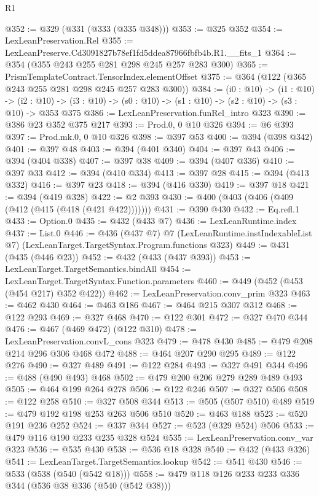 \begin{lexlean}{R1}
\begin{coremodule}
@352 := @329 (@331 (@333 (@335 @348)))
@353 := @325 @352
@354 := LexLeanPreservation.Rel
@355 := LexLeanPreserve.Cd3091827b78ef1fd5ddea87966fbfb4b.R1.__fits_1
@364 := @354 (@355 @243 @255 @281 @298 @245 @257 @283 @300)
@365 := PrismTemplateContract.TensorIndex.elementOffset
@375 := @364 (@122 (@365 @243 @255 @281 @298 @245 @257 @283 @300))
@384 := (i0 : @10) ->
  (i1 : @10) ->
  (i2 : @10) -> (i3 : @10) -> (s0 : @10) -> (s1 : @10) -> (s2 : @10) -> (s3 : @10) -> @353 @375
@386 := LexLeanPreservation.funRel_intro @323
@390 := @386 @23 @352 @375 @217
@393 := Prod.{0, 0} @10 @326
@394 := @6 @393
@397 := Prod.mk.{0, 0} @10 @326
@398 := @397 @53
@400 := @394 (@398 @342)
@401 := @397 @48
@403 := @394 (@401 @340)
@404 := @397 @43
@406 := @394 (@404 @338)
@407 := @397 @38
@409 := @394 (@407 @336)
@410 := @397 @33
@412 := @394 (@410 @334)
@413 := @397 @28
@415 := @394 (@413 @332)
@416 := @397 @23
@418 := @394 (@416 @330)
@419 := @397 @18
@421 := @394 (@419 @328)
@422 := @2 @393
@430 := @400 (@403 (@406 (@409 (@412 (@415 (@418 (@421 @422)))))))
@431 := @390 @430
@432 := Eq.refl.{1}
@433 := Option.{0}
@435 := @432 (@433 @7)
@436 := LexLeanRuntime.index
@437 := List.{0}
@446 := @436
    (@437 @7)
    @7
    (LexLeanRuntime.instIndexableList @7)
    (LexLeanTarget.TargetSyntax.Program.functions @323)
@449 := @431 (@435 (@446 @23))
@452 := @432 (@433 (@437 @393))
@453 := LexLeanTarget.TargetSemantics.bindAll
@454 := LexLeanTarget.TargetSyntax.Function.parameters
@460 := @449 (@452 (@453 (@454 @217) @352 @422))
@462 := LexLeanPreservation.conv_prim @323
@463 := @462 @430
@464 := @463 @186
@467 := @464 @215 @307 @312
@468 := @122 @293
@469 := @327 @468
@470 := @122 @301
@472 := @327 @470 @344
@476 := @467 (@469 @472) (@122 @310)
@478 := LexLeanPreservation.convL_cons @323
@479 := @478 @430
@485 := @479 @208 @214 @296 @306 @468 @472
@488 := @464 @207 @290 @295
@489 := @122 @276
@490 := @327 @489
@491 := @122 @284
@493 := @327 @491 @344
@496 := @488 (@490 @493) @468
@502 := @479 @200 @206 @279 @289 @489 @493
@505 := @464 @199 @264 @278
@506 := @122 @246
@507 := @327 @506
@508 := @122 @258
@510 := @327 @508 @344
@513 := @505 (@507 @510) @489
@519 := @479 @192 @198 @253 @263 @506 @510
@520 := @463 @188
@523 := @520 @191 @236 @252
@524 := @337 @344
@527 := @523 (@329 @524) @506
@533 := @479 @116 @190 @233 @235 @328 @524
@535 := LexLeanPreservation.conv_var @323
@536 := @535 @430
@538 := @536 @18 @328
@540 := @432 (@433 @326)
@541 := LexLeanTarget.TargetSemantics.lookup
@542 := @541 @430
@546 := @533 (@538 (@540 (@542 @18)))
@558 := @479 @118 @126 @233 @233 @336 @344 (@536 @38 @336 (@540 (@542 @38)))

\end{coremodule}
\end{lexlean}
